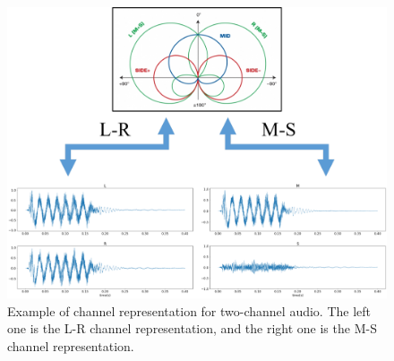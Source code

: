 \begin{figure}[t]
    \centering
    \includegraphics[width=0.85\linewidth]{assets/figures/LRMS.pdf}
    \caption{Example of channel representation for two-channel audio. The left one is the L-R channel representation, and the right one is the M-S channel representation.}
    \label{fig:quality_result}
\end{figure}